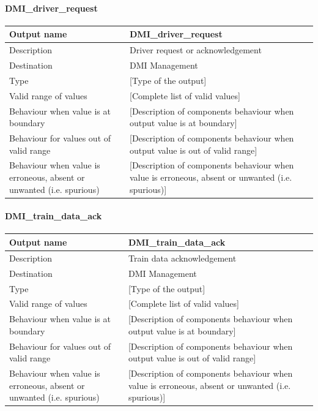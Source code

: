 \paragraph{DMI\_driver\_request}

\begin{longtable}{p{}p{}}
\toprule
Output name				& DMI\_driver\_request \\
\midrule
Description				& Driver request or acknowledgement \\
\midrule
Destination				& DMI Management \\ 
\midrule
Type					& [Type of the output] \\
\midrule
Valid range of values	& [Complete list of valid values] \\
\midrule
Behaviour when value is at boundary	& [Description of components behaviour when output value is at boundary] \\
\midrule
Behaviour for values out of valid range	& [Description of components behaviour when output value is out of valid range] \\
\midrule
Behaviour when value is erroneous, absent or unwanted (i.e. spurious) & [Description of components behaviour when value is erroneous, absent or unwanted (i.e. spurious)] \\
\bottomrule
\end{longtable}


\paragraph{DMI\_train\_data\_ack}

\begin{longtable}{p{}p{}}
\toprule
Output name				& DMI\_train\_data\_ack \\
\midrule
Description				& Train data acknowledgement \\
\midrule
Destination				& DMI Management \\ 
\midrule
Type					& [Type of the output] \\
\midrule
Valid range of values	& [Complete list of valid values] \\
\midrule
Behaviour when value is at boundary	& [Description of components behaviour when output value is at boundary] \\
\midrule
Behaviour for values out of valid range	& [Description of components behaviour when output value is out of valid range] \\
\midrule
Behaviour when value is erroneous, absent or unwanted (i.e. spurious) & [Description of components behaviour when value is erroneous, absent or unwanted (i.e. spurious)] \\
\bottomrule
\end{longtable}


